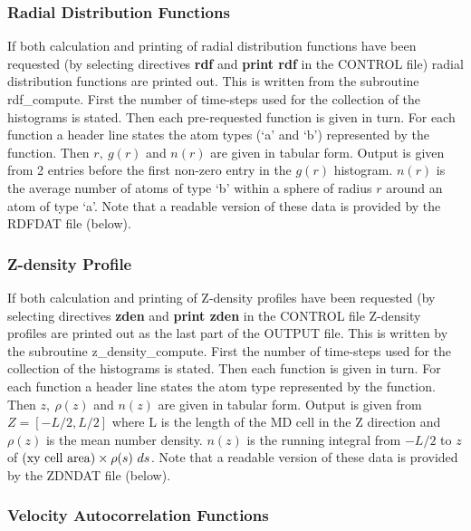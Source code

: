 \subsubsection{Radial Distribution Functions}

If both calculation and printing of radial distribution functions
have been requested (by selecting directives {\bf rdf} and {\bf
print rdf} in the CONTROL file) radial distribution functions are
printed out.  This is written from the subroutine {\sc
rdf\_compute}.  First the number of time-steps used for the
collection of the histograms is stated.  Then each pre-requested
function is given in turn.  For each function a header line states
the atom types (`a' and `b') represented by the function.  Then
$r,~g(r)$ and $n(r)$ are given in tabular form.  Output is given
from 2 entries before the first non-zero entry in the $g(r)$
histogram.  $n(r)$ is the average number of atoms of type `b' within
a sphere of radius $r$ around an atom of type `a'.
Note that a readable version of these data is provided by the
RDFDAT file (below).

\subsubsection{Z-density Profile}

If both calculation and printing of Z-density profiles have been
requested (by selecting directives {\bf zden} and {\bf print zden}
in the CONTROL file Z-density profiles are printed out as the last
part of the OUTPUT file.  This is written by the subroutine {\sc
z\_density\_compute}.  First the number of time-steps used for the
collection of the histograms is stated.  Then each function is given
in turn.  For each function a header line states the atom type
represented by the function.  Then $z,~\rho(z)$ and $n(z)$ are given
in tabular form. Output is given from $Z = [-L/2,L/2]$ where L is
the length of the MD cell in the Z direction and $\rho(z)$ is the
mean number density.  $n(z)$ is the running integral from $-L/2$ to
$z$ of $({\rm xy~cell~area}) \times \rho(s)~ds$.
Note that a readable version of these data is provided by the
ZDNDAT file (below).

\subsubsection{Velocity Autocorrelation Functions}

